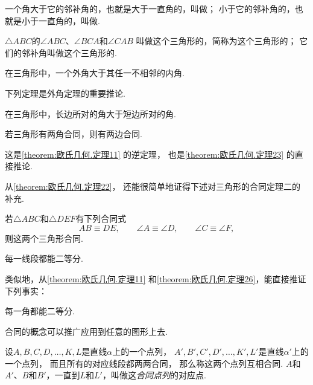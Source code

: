 \begin{definition}
一个角大于它的邻补角的，也就是大于一直角的，叫做；
小于它的邻补角的，也就是小于一直角的，叫做.
\end{definition}

\begin{definition}
\(\triangle ABC\)的\(\angle ABC\)、\(\angle BCA\)和\(\angle CAB\)
叫做这个三角形的，简称为这个三角形的；
它们的邻补角叫做这个三角形的.
\end{definition}

\begin{theorem}[外角定理]\label{theorem:欧氏几何.定理22}
在三角形中，一个外角大于其任一不相邻的内角.
\end{theorem}

下列定理是外角定理的重要推论.

\begin{theorem}\label{theorem:欧氏几何.定理23}
在三角形中，长边所对的角大于短边所对的角.
\end{theorem}

\begin{theorem}\label{theorem:欧氏几何.定理24}
若三角形有两角合同，则有两边合同.
\end{theorem}
这是\cref{theorem:欧氏几何.定理11} 的逆定理，
也是\cref{theorem:欧氏几何.定理23} 的直接推论.

从\cref{theorem:欧氏几何.定理22}，
还能很简单地证得下述对三角形的合同定理二的补充.
\begin{theorem}\label{theorem:欧氏几何.定理25}
若\(\triangle ABC\)和\(\triangle DEF\)有下列合同式\[
	AB \equiv DE, \qquad
	\angle A \equiv \angle D, \qquad
	\angle C \equiv \angle F,
\]
则这两个三角形合同.
\end{theorem}

\begin{theorem}\label{theorem:欧氏几何.定理26}
每一线段都能二等分.
\end{theorem}

类似地，从\cref{theorem:欧氏几何.定理11} 和\cref{theorem:欧氏几何.定理26}，能直接推证下列事实：
\begin{theorem}
每一角都能二等分.
\end{theorem}

合同的概念可以推广应用到任意的图形上去.

\begin{definition}
设\(A,B,C,D,\dotsc,K,L\)是直线\(\alpha\)上的一个点列，
\(A',B',C',D',\dotsc,K',L'\)是直线\(\alpha'\)上的一个点列，
而且所有的对应线段都两两合同，
那么称这两个点列互相合同.
\(A\)和\(A'\)、\(B\)和\(B'\)，一直到\(L\)和\(L'\)，叫做这\emph{合同点列}的对应点.
\end{definition}

